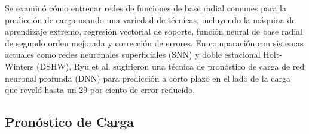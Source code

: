 \documentclass[crop=false]{standalone}
\begin{document}
Se examinó cómo entrenar redes de funciones de base radial comunes para la predicción de carga usando una variedad de técnicas, incluyendo la máquina de aprendizaje extremo, regresión vectorial de soporte, función neural de base radial de segundo orden mejorada y corrección de errores.
En comparación con sistemas actuales como redes neuronales superficiales (SNN) y doble estacional Holt-Winters (DSHW), Ryu et al. sugirieron una técnica de pronóstico de carga de red neuronal profunda (DNN) para predicción a corto plazo en el lado de la carga que reveló hasta un 29 por ciento de error reducido.

\subsection{Pronóstico de Carga}
\end{document}
